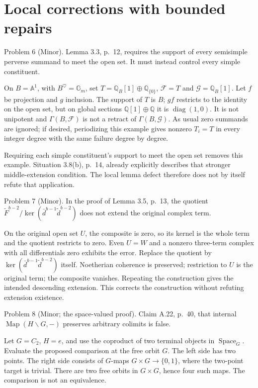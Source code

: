 \documentclass[10pt]{article}
\begin{document}
\section*{Local corrections with bounded repairs}
Problem 6 (Minor).  Lemma 3.3, p. 12, requires the support of every semisimple perverse summand to meet the open set. It must instead control every simple constituent.\par
On \(B=\mathbb A^1\), with \(B^\heartsuit=\mathbb G_m\), set \(T=\mathbb Q_B[1]\oplus\mathbb Q_{\{0\}}\), \(\mathcal F=T\) and \(\mathcal G=\mathbb Q_B[1]\). Let \(f\) be projection and \(g\) inclusion. The support of \(T\) is \(B\); \(gf\) restricts to the identity on the open set, but on global sections \(\mathbb Q[1]\oplus\mathbb Q\) it is \(\operatorname{diag}(1,0)\). It is not unipotent and \(\Gamma(B,\mathcal F)\) is not a retract of \(\Gamma(B,\mathcal G)\). As usual zero summands are ignored; if desired, periodizing this example gives nonzero \(T_i=T\) in every integer degree with the same failure degree by degree.\par
Requiring each simple constituent’s support to meet the open set removes this example. Situation 3.8(b), p. 14, already explicitly describes that stronger middle-extension condition. The local lemma defect therefore does not by itself refute that application.\par
Problem 7 (Minor).  In the proof of Lemma 3.5, p. 13, the quotient \(\widetilde F^{b-2}/\ker(\bar d^{b-1}\widetilde d^{b-2})\) does not extend the original complex term.\par
On the original open set \(U\), the composite is zero, so its kernel is the whole term and the quotient restricts to zero. Even \(U=W\) and a nonzero three-term complex with all differentials zero exhibits the error. Replace the quotient by \(\ker(\bar d^{b-1}\widetilde d^{b-2})\) itself. Noetherian coherence is preserved; restriction to \(U\) is the original term; the composite vanishes. Repeating the construction gives the intended descending extension. This corrects the construction without refuting extension existence.\par
Problem 8 (Minor; the space-valued proof).  Claim A.22, p. 40, that internal \(\operatorname{Map}(H\backslash G,-)\) preserves arbitrary colimits is false.\par
Let \(G=C_2\), \(H=e\), and use the coproduct of two terminal objects in \(\operatorname{Space}_G\). Evaluate the proposed comparison at the free orbit \(G\). The left side has two points. The right side consists of \(G\)-maps \(G\times G\to\{0,1\}\), where the two-point target is trivial. There are two free orbits in \(G\times G\), hence four such maps. The comparison is not an equivalence.\par
\end{document}

